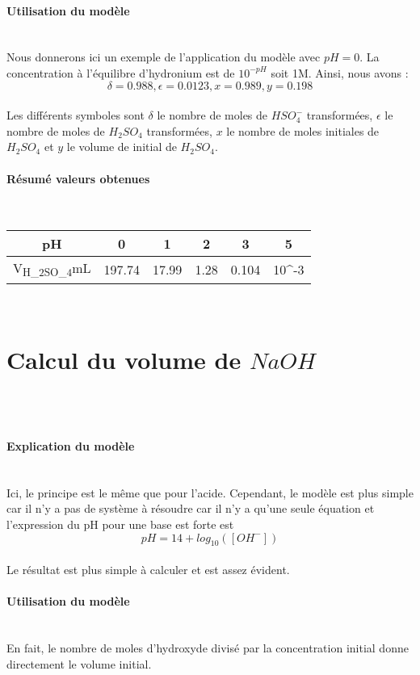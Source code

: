 \documentclass{article}
\begin{document}
\paragraph{Utilisation du modèle}
 \\
Nous donnerons ici un exemple de l'application du modèle avec $pH=0$. La concentration à l'équilibre d'hydronium est de $10^{-pH}$ soit \unit{1}{M}. Ainsi, nous avons : 
\\
$$ \delta = 0.988 ,\epsilon = 0.0123, x = 0.989, y = 0.198 $$
\\
Les différents symboles sont $\delta$ le nombre de moles de $HSO_{4}^{-}$ transformées, $\epsilon$ le nombre de moles de $H_{2}SO_{4}$ transformées, $x$ le nombre de moles initiales de $H_{2}SO_{4}$ et $y$ le volume de initial de $H_{2}SO_{4}$.
\\
\paragraph{Résumé valeurs obtenues}
\\
\begin{tabular}{c|c|c|c|c|c}
		pH & 0 & 1 & 2 & 3 & 5\\
		\hline
		\unit{V_{H_{2}SO_{4}}}{mL} & 197.74 & 17.99 & 1.28 & 0.104 & 10^{-3}\\
\end{tabular}
\\
\section{Calcul du volume de $NaOH$}
\\\\
\paragraph{Explication du modèle}
\\
Ici, le principe est le même que pour l'acide. Cependant, le modèle est plus simple car il n'y a pas de système à résoudre car il n'y a qu'une seule équation et l'expression du pH pour une base est forte est
\\
$$pH = 14 + log_{10}([OH^{-}])$$
\\
Le résultat est plus simple à calculer et est assez évident.
\\
\paragraph{Utilisation du modèle}
\\
En fait, le nombre de moles d'hydroxyde divisé par la concentration initial donne directement le volume initial.
\\
\end{document}
